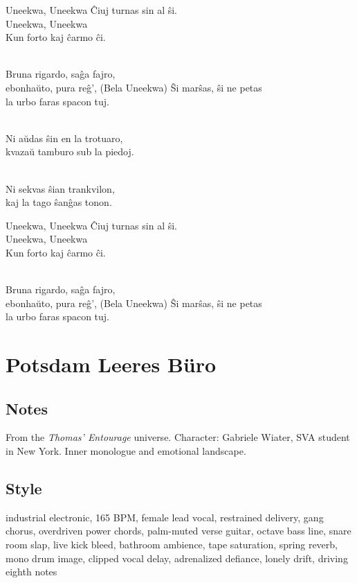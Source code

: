 \begin{lyrics}
Uneekwa, Uneekwa
Ĉiuj turnas sin al ŝi.\\
Uneekwa, Uneekwa\\
Kun forto kaj ĉarmo ĉi.

\\
Bruna rigardo, saĝa fajro,
\\
ebonhaŭto, pura reĝ’,
(Bela Uneekwa)
Ŝi marŝas, ŝi ne petas
\\
la urbo faras spacon tuj.

\\
Ni aŭdas ŝin en la trotuaro,\\
kvazaŭ tamburo sub la piedoj.

\\
Ni sekvas ŝian trankvilon,\\
kaj la tago ŝanĝas tonon.

Uneekwa, Uneekwa
Ĉiuj turnas sin al ŝi.\\
Uneekwa, Uneekwa\\
Kun forto kaj ĉarmo ĉi.

\\
Bruna rigardo, saĝa fajro,
\\
ebonhaŭto, pura reĝ’,
(Bela Uneekwa)
Ŝi marŝas, ŝi ne petas
\\
la urbo faras spacon tuj.
\end{lyrics}

\section{Potsdam Leeres Büro}

\subsection{Notes}
From the \emph{Thomas' Entourage} universe.
Character: Gabriele Wiater, SVA student in New York.
Inner monologue and emotional landscape.

\subsection{Style}
industrial electronic, 165 BPM, female lead vocal, restrained delivery, gang chorus, overdriven power chords, palm-muted verse guitar, octave bass line, snare room slap, live kick bleed, bathroom ambience, tape saturation, spring reverb, mono drum image, clipped vocal delay, adrenalized defiance, lonely drift, driving eighth notes

